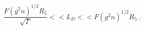 \begin{equation}
 \frac{F (g^2n)^{1/2}R_5}{\sqrt \Gamma}<<L_D<<F (g^2n)^{1/2}R_5
\ .
\label{limit}
\end{equation}

